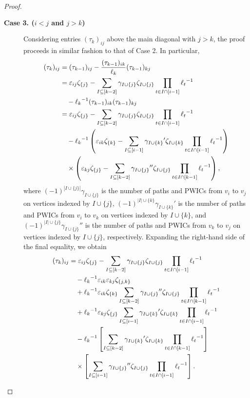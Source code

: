 \documentclass[10pt,a4paper]{amsart}
\begin{document}
\begin{proof}
\begin{description}
\end{description}

\begin{description}
\item [{\bf Case 3. ($i<j$ and $j>k$)}]

Considering entries $(\tau_k)_{ij}$ above the main diagonal with $j>k$,  the proof proceeds in similar fashion to that of Case 2.   In particular, 
 \begin{align*}
(\tau_k)_{ij}&=(\tau_{k-1})_{ij}-\frac{(\tau_{k-1})_{ik}}{\ell_k}(\tau_{k-1})_{kj}\\
&=\varepsilon_{ij}\zeta_{\{j\}}-\sum_{I\subseteq [k-2]}\gamma_{I\cup\{j\}}\zeta_{I\cup\{j\}}\prod_{t\in I\cap[i-1]}{\ell_t}^{-1}\\
&\hskip10pt-{\ell_k}^{-1}(\tau_{k-1})_{ik}(\tau_{k-1})_{kj}\\
&=\varepsilon_{ij}\zeta_{\{j\}}-\sum_{I\subseteq [k-2]}\gamma_{I\cup\{j\}}\zeta_{I\cup\{j\}}\prod_{t\in I\cap[i-1]}{\ell_t}^{-1}\\
&\hskip10pt-{\ell_k}^{-1}\left(\varepsilon_{ik}\zeta_{\{k\}}-\sum_{I\subseteq [i-1]}{\gamma_{I\cup\{k\}}}'\zeta_{I\cup\{k\}}\prod_{t\in I\cap[i-1]}{\ell_t}^{-1}\right)\\
&\hskip10pt\times\left(\varepsilon_{kj}\zeta_{\{j\}}-\sum_{I\subseteq [k-2]}{\gamma_{I\cup\{j\}}}''\zeta_{I\cup\{j\}}\prod_{t\in I\cap[k-1]}{\ell_t}^{-1}\right),
\end{align*}
where $(-1)^{|I\cup\{j\}|}\gamma_{I\cup\{j\}}$ is the number of paths and PWICs from $v_i$ to $v_j$ on vertices indexed by $I\cup\{j\}$, $(-1)^{|I|\cup\{k\}}{\gamma_{I\cup\{k\}}}'$ is the number of paths and PWICs from $v_i$ to $v_k$ on vertices indexed by $I\cup\{k\}$, and $(-1)^{|I|\cup\{j\}}{\gamma_{I\cup\{j\}}}''$ is the number of paths and PWICs from $v_k$ to $v_j$ on vertices indexed by $I\cup\{j\}$, respectively.
Expanding the right-hand side of the final equality, we obtain 
\begin{align*}
(\tau_k)_{ij}&=\varepsilon_{ij}\zeta_{\{j\}}-\sum_{I\subseteq [k-2]}\gamma_{I\cup\{j\}}\zeta_{I\cup\{j\}}\prod_{t\in I\cap[i-1]}{\ell_t}^{-1}\\
&\hskip10pt-{\ell_k}^{-1}\varepsilon_{ik}\varepsilon_{kj}\zeta_{\{j,k\}}\\
&\hskip10pt+{\ell_k}^{-1}\varepsilon_{ik}\zeta_{\{k\}}\sum_{I\subseteq [k-2]}{\gamma_{I\cup\{j\}}}''\zeta_{I\cup\{j\}}\prod_{t\in I\cap[k-1]}{\ell_t}^{-1}\\
&\hskip10pt+{\ell_k}^{-1}\varepsilon_{kj}\zeta_{\{j\}}\sum_{I\subseteq [i-1]}{\gamma_{I\cup\{k\}}}'\zeta_{I\cup\{k\}}\prod_{t\in I\cap[i-1]}{\ell_t}^{-1}\\
&\hskip10pt-{\ell_k}^{-1}\left[\sum_{I\subseteq [k-2]}{\gamma_{I\cup\{k\}}}'\zeta_{I\cup\{k\}}\prod_{t\in I\cap[k-1]}{\ell_t}^{-1}\right]\\
&\hskip10pt\times\left[\sum_{I\subseteq [i-1]}{\gamma_{I\cup\{j\}}}''\zeta_{I\cup\{j\}}\prod_{t\in I\cap[i-1]}{\ell_t}^{-1}\right].
\end{align*}



\end{description}
\end{proof}
\end{document}
